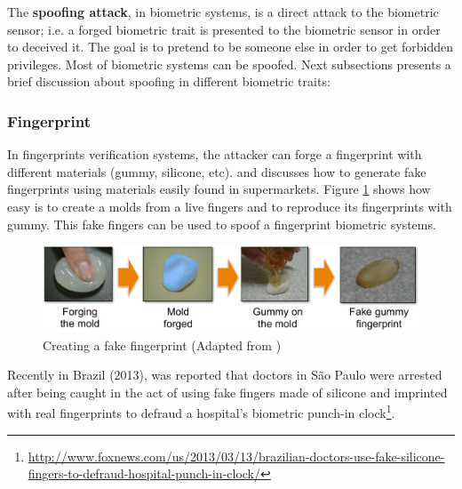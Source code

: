 
The \textbf{spoofing attack}, in biometric systems, is a direct attack to the biometric sensor; i.e. a forged biometric trait is presented to the biometric sensor in order to deceived it. The goal is to pretend to be someone else in order to get forbidden privileges. Most of biometric systems can be spoofed. Next subsections presents a brief discussion about spoofing in different biometric traits:

\subsubsection{Fingerprint}

In fingerprints verification systems, the attacker can forge a fingerprint with different materials (gummy, silicone, etc). \cite{matsumoto2002impact} and \cite{leyden2002gummi} discusses how to generate fake fingerprints using materials easily found in supermarkets. Figure \ref{fig:finger_attack} shows how easy is to create a molds from a live fingers and to reproduce its fingerprints with gummy. This fake fingers can be used  to spoof a fingerprint biometric systems.

\begin{figure}[!htb]
\begin{center}
\includegraphics [width=16cm] {images/finger_print_attack.pdf}
\caption[Creating a fake fingerprint]{Creating a fake fingerprint (Adapted from \cite{matsumoto2002impact})} \label{fig:finger_attack}
\end{center}
\end{figure}

Recently in Brazil (2013), was reported that doctors in S\~ao Paulo were arrested after being caught in the act of using fake fingers made of silicone and imprinted with real fingerprints to defraud a hospital's biometric punch-in clock\footnote{\url{http://www.foxnews.com/us/2013/03/13/brazilian-doctors-use-fake-silicone-fingers-to-defraud-hospital-punch-in-clock/}}.

